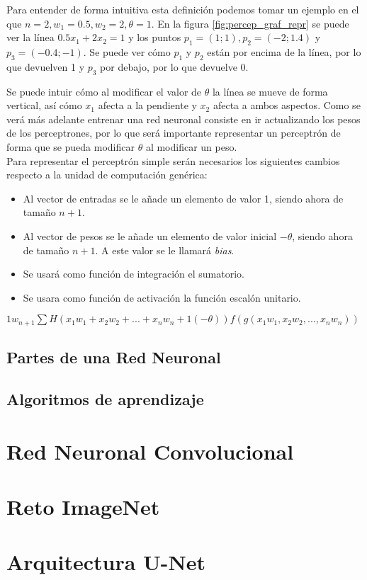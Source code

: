 Para entender de forma intuitiva esta definición podemos tomar un ejemplo en el que $ n = 2, w_1 = 0.5, w_2 = 2, \theta = 1 $. En la figura \ref{fig:percep_graf_repr} se puede ver la línea $ 0.5x_1 + 2x_2 = 1 $ y los puntos $ p_1=(1;1), p_2=(-2;1.4) $ y $ p_3=(-0.4;-1) $. Se puede ver cómo $ p_1 $ y $ p_2 $ están por encima de la línea, por lo que devuelven 1 y $ p_3 $ por debajo, por lo que devuelve 0.


Se puede intuir cómo al modificar el valor de $ \theta $ la línea se mueve de forma vertical, así cómo $ x_1 $ afecta a la pendiente y $ x_2 $ afecta a ambos aspectos. Como se verá más adelante entrenar una red neuronal consiste en ir actualizando los pesos de los perceptrones, por lo que será importante representar un perceptrón de forma que se pueda modificar $ \theta $ al modificar un peso.\\

Para representar el perceptrón simple serán necesarios los siguientes cambios respecto a la unidad de computación genérica:
\begin{itemize}
\item Al vector de entradas se le añade un elemento de valor 1, siendo ahora de tamaño $ n+1 $.
\item Al vector de pesos se le añade un elemento de valor inicial $ -\theta $, siendo ahora de tamaño $ n+1 $. A este valor se le llamará \textit{bias}.
\item Se usará como función de integración el sumatorio.
\item Se usara como función de activación la función escalón unitario.
\end{itemize}

$ 1 w_{n+1} \sum H(x_1w_1+x_2w_2+...+x_nw_n+1(-\theta)) f(g(x_1w_1,x_2w_2,...,x_nw_n))$


\subsection{Partes de una Red Neuronal}\label{subsec:nn_partes}
\subsection{Algoritmos de aprendizaje}\label{subsec:learning_algos}
\section{Red Neuronal Convolucional}\label{sec:cnn}
\section{Reto ImageNet}\label{sec:imagenet}
\section{Arquitectura U-Net}\label{sec:unet}